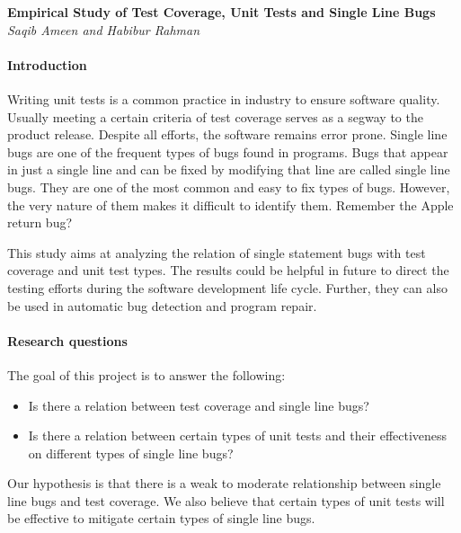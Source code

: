 \documentclass[11pt]{article}
\begin{document}
\begin{center}
{\bf \Large Empirical Study of Test Coverage, Unit Tests and Single Line Bugs}\\
\vspace{.1in}
{\em Saqib Ameen and Habibur Rahman}
\end{center}


\paragraph{Introduction}

Writing unit tests is a common practice in industry to ensure software quality. Usually meeting a certain criteria of test coverage serves as a segway to the product release. Despite all efforts, the software remains error prone. Single line bugs are one of the frequent types of bugs found in programs. Bugs that appear in just a single line and can be fixed by modifying that line are called single line bugs. They are one of the most common and easy to fix types of bugs. However, the very nature of them makes it difficult to identify them. Remember the Apple return bug? 

This study aims at analyzing the relation of single statement bugs with test coverage and unit test types. The results could be helpful in future to direct the testing efforts during the software development life cycle. Further, they can also be used in automatic bug detection and program repair.
\paragraph{Research questions}

The goal of this project is to answer the following:
\begin{itemize}
\item Is there a relation between test coverage and single line bugs?
\item Is there a relation between certain types of unit tests and their effectiveness on different types of single line bugs?
\end{itemize}

Our hypothesis is that there is a weak to moderate relationship between single line bugs and test coverage. We also believe that certain types of unit tests will be effective to mitigate certain types of single line bugs.
\end{document}
